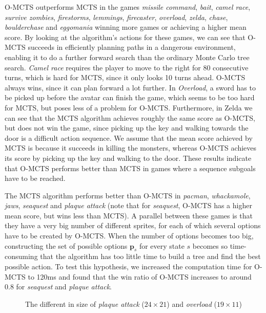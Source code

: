 O-MCTS outperforms MCTS in the games \textit{missile command}, \textit{bait},
\textit{camel race}, \textit{survive zombies}, \textit{firestorms},
\textit{lemmings}, \textit{firecaster}, \textit{overload}, \textit{zelda},
\textit{chase}, \textit{boulderchase} and \textit{eggomania} winning more games
or achieving a higher mean score. By looking at the algorithm's actions for
these games, we can see that O-MCTS succeeds in efficiently planning paths in a
dangerous environment, enabling it to do a further forward search than the
ordinary Monte Carlo tree search. \textit{Camel race} requires the player to
move to the right for 80 consecutive turns, which is hard for MCTS, since
it only looks 10 turns ahead. O-MCTS always wins, since it can plan forward a
lot further. In \textit{Overload}, a sword has to be picked up before the avatar
can finish the game, which seems to be too hard for MCTS, but poses less of a
problem for O-MCTS.  Furthermore, in Zelda we can see that the MCTS algorithm
achieves roughly the same score as O-MCTS, but does not win the game, since
picking up the key and walking towards the door is a difficult action sequence.
We assume that the mean score achieved by MCTS is because it succeeds in killing
the monsters, whereas O-MCTS achieves its score by picking up the key and
walking to the door.  These results indicate that O-MCTS performs better than
MCTS in games where a sequence subgoals have to be reached.

The MCTS algorithm performs better than O-MCTS in \textit{pacman},
\textit{whackamole}, \textit{jaws}, \textit{seaquest} and \textit{plaque attack}
(note that for \textit{seaquest}, O-MCTS has a higher mean score, but wins less
than MCTS). A parallel between these games is that they have a very
big number of different sprites, for each of which several options have to be
created by O-MCTS. When the number of options becomes too big, constructing the
set of possible options $\mathbf{p}_s$ for every state $s$ becomes so
time-consuming that the algorithm has too little time to build a tree and find
the best possible action. To test this hypothesis, we increased the computation
time for O-MCTS to 120ms and found that the win ratio of O-MCTS increases to
around $0.8$ for \textit{seaquest} and \textit{plaque attack}.

\begin{figure}
	\centering
	\caption{The different in size of \textit{plaque attack} ($24\times21$) and 
		\textit{overload} ($19\times11$)}
	\label{fig:game-size}
\end{figure}

